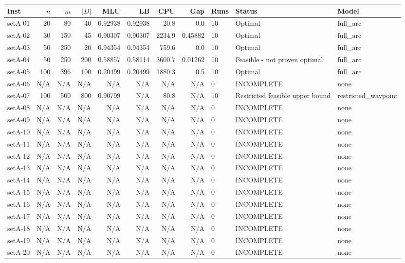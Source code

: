 \begin{tabular}{lrrrrrrrlll}
\toprule
Inst & $n$ & $m$ & $|D|$ & MLU & LB & CPU & Gap & Runs & Status & Model \\ \midrule
setA-01 & 20 & 80 & 40 & 0.92938 & 0.92938 & 20.8 & 0.0 & 10 & Optimal & full\_arc \\
setA-02 & 30 & 150 & 45 & 0.90307 & 0.90307 & 2234.9 & 0.45882 & 10 & Optimal & full\_arc \\
setA-03 & 50 & 250 & 20 & 0.94354 & 0.94354 & 759.6 & 0.0 & 10 & Optimal & full\_arc \\
setA-04 & 50 & 250 & 200 & 0.58857 & 0.58114 & 3600.7 & 0.01262 & 10 & Feasible - not proven optimal & full\_arc \\
setA-05 & 100 & 396 & 100 & 0.20499 & 0.20499 & 1880.3 & 0.5 & 10 & Optimal & full\_arc \\
setA-06 & N/A & N/A & N/A & N/A & N/A & N/A & N/A & 0 & INCOMPLETE & none \\
setA-07 & 100 & 500 & 800 & 0.90799 & N/A & 80.8 & N/A & 10 & Restricted feasible upper bound & restricted\_waypoint \\
setA-08 & N/A & N/A & N/A & N/A & N/A & N/A & N/A & 0 & INCOMPLETE & none \\
setA-09 & N/A & N/A & N/A & N/A & N/A & N/A & N/A & 0 & INCOMPLETE & none \\
setA-10 & N/A & N/A & N/A & N/A & N/A & N/A & N/A & 0 & INCOMPLETE & none \\
setA-11 & N/A & N/A & N/A & N/A & N/A & N/A & N/A & 0 & INCOMPLETE & none \\
setA-12 & N/A & N/A & N/A & N/A & N/A & N/A & N/A & 0 & INCOMPLETE & none \\
setA-13 & N/A & N/A & N/A & N/A & N/A & N/A & N/A & 0 & INCOMPLETE & none \\
setA-14 & N/A & N/A & N/A & N/A & N/A & N/A & N/A & 0 & INCOMPLETE & none \\
setA-15 & N/A & N/A & N/A & N/A & N/A & N/A & N/A & 0 & INCOMPLETE & none \\
setA-16 & N/A & N/A & N/A & N/A & N/A & N/A & N/A & 0 & INCOMPLETE & none \\
setA-17 & N/A & N/A & N/A & N/A & N/A & N/A & N/A & 0 & INCOMPLETE & none \\
setA-18 & N/A & N/A & N/A & N/A & N/A & N/A & N/A & 0 & INCOMPLETE & none \\
setA-19 & N/A & N/A & N/A & N/A & N/A & N/A & N/A & 0 & INCOMPLETE & none \\
setA-20 & N/A & N/A & N/A & N/A & N/A & N/A & N/A & 0 & INCOMPLETE & none \\
\bottomrule
\end{tabular}
